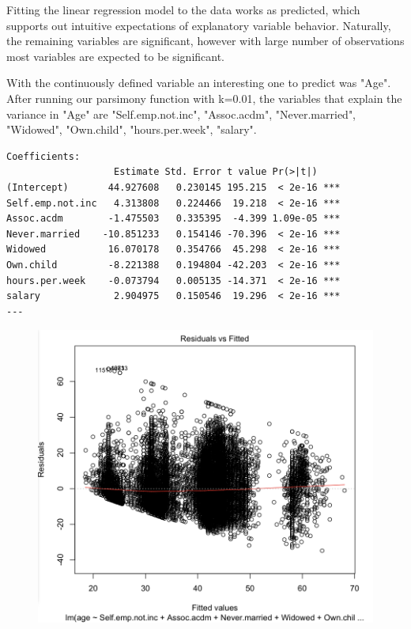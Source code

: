 \documentclass[letter]{article}
\begin{document}
Fitting the linear regression model to the data works as predicted, which supports out intuitive expectations of explanatory variable behavior. Naturally, the remaining variables are significant, however with large number of observations most variables are expected to be significant. 


With the continuously defined variable an interesting one to predict was "Age". After running our parsimony function with k=0.01, the variables that explain the variance in "Age" are "Self.emp.not.inc", "Assoc.acdm", "Never.married", "Widowed", "Own.child", "hours.per.week", "salary".   

\begin{verbatim}
Coefficients:
                   Estimate Std. Error t value Pr(>|t|)    
(Intercept)       44.927608   0.230145 195.215  < 2e-16 ***
Self.emp.not.inc   4.313808   0.224466  19.218  < 2e-16 ***
Assoc.acdm        -1.475503   0.335395  -4.399 1.09e-05 ***
Never.married    -10.851233   0.154146 -70.396  < 2e-16 ***
Widowed           16.070178   0.354766  45.298  < 2e-16 ***
Own.child         -8.221388   0.194804 -42.203  < 2e-16 ***
hours.per.week    -0.073794   0.005135 -14.371  < 2e-16 ***
salary             2.904975   0.150546  19.296  < 2e-16 ***
---
\end{verbatim}

\begin{figure}
 \includegraphics[scale=0.5]{figures/ageResidCensus.png}
 \caption{}
 \label{fig:ageResidCensus}
\end{figure}
 
\end{document}
